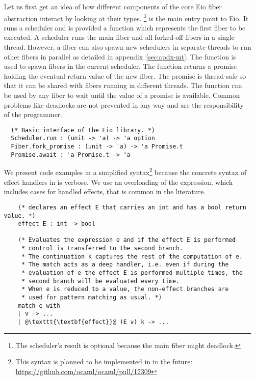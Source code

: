 Let us first get an idea of how different components of the core Eio fiber abstraction interact by looking at their types.
\footnote{The scheduler's result is optional because the main fiber might deadlock.} is the main entry point to Eio.
It runs a scheduler and is provided a function which represents the first fiber to be executed.
A scheduler runs the main fiber and all forked-off fibers in a single thread.
However, a fiber can also spawn new schedulers in separate threads to run other fibers in parallel as detailed in appendix~\ref{sec:apdx-mt}.
The  function is used to spawn fibers in the current scheduler.
The function returns a promise holding the eventual return value of the new fiber.
The promise is thread-safe so that it can be shared with fibers running in different threads.
The  function can be used by any fiber to wait until the value of a promise is available.
Common problems like deadlocks are not prevented in any way and are the responsibility of the programmer.


\begin{verbatim}
  (* Basic interface of the Eio library. *)
  Scheduler.run : (unit -> 'a) -> 'a option
  Fiber.fork_promise : (unit -> 'a) -> 'a Promise.t
  Promise.await : 'a Promise.t -> 'a
\end{verbatim}

We present code examples in a simplified syntax\footnote{This syntax is planned to be implemented in \ocf{} in the future: \url{https://github.com/ocaml/ocaml/pull/12309}} because the concrete syntax of effect handlers in \ocf{} is verbose.
We use an overloading of the  expression, which includes cases for handled effects, that is common in the literature.

\begin{verbatim}
    (* declares an effect E that carries an int and has a bool return value. *)
    effect E : int -> bool

    (* Evaluates the expression e and if the effect E is performed 
     * control is transferred to the second branch.
     * The continuation k captures the rest of the computation of e.
     * The match acts as a deep handler, i.e. even if during the 
     * evaluation of e the effect E is performed multiple times, the
     * second branch will be evaluated every time.
     * When e is reduced to a value, the non-effect branches are 
     * used for pattern matching as usual. *)
    match e with
    | v -> ...
    | @\texttt{\textbf{effect}}@ (E v) k -> ...
\end{verbatim}

